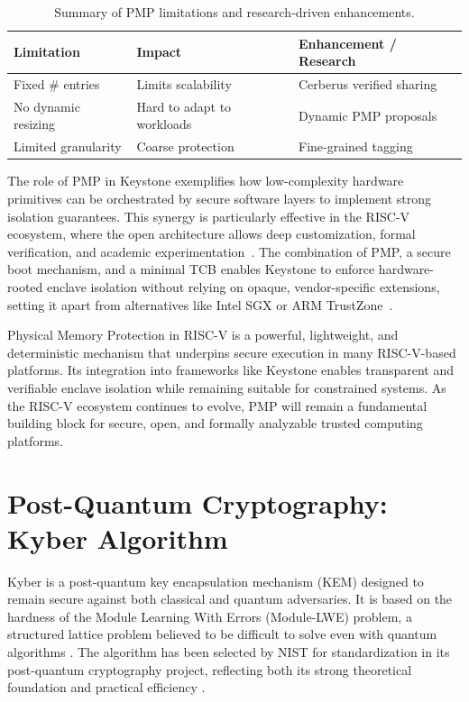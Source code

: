 \begin{table}[htbp]
\centering
\caption{Summary of PMP limitations and research‑driven enhancements.}
\label{tab:pmp-limitations}
\renewcommand{\arraystretch}{1.2}
\begin{tabular}{>{\raggedright}p{3cm} >{\raggedright}p{4cm} >{\raggedright\arraybackslash}p{5cm}}
\hline
\textbf{Limitation} & \textbf{Impact} & \textbf{Enhancement / Research} \\
\hline
Fixed \# entries & Limits scalability & Cerberus verified sharing \\
No dynamic resizing & Hard to adapt to workloads & Dynamic PMP proposals \\
Limited granularity & Coarse protection & Fine‑grained tagging \\
\hline
\end{tabular}
\end{table}

The role of PMP in Keystone exemplifies how low-complexity hardware primitives can be orchestrated by secure software layers to implement strong isolation guarantees. This synergy is particularly effective in the RISC-V ecosystem, where the open architecture allows deep customization, formal verification, and academic experimentation~\cite{Survey2023}. The combination of PMP, a secure boot mechanism, and a minimal TCB enables Keystone to enforce hardware-rooted enclave isolation without relying on opaque, vendor-specific extensions, setting it apart from alternatives like Intel SGX or ARM TrustZone~\cite{Lee2019,suzaki2021tsperf}.

Physical Memory Protection in RISC-V is a powerful, lightweight, and deterministic mechanism that underpins secure execution in many RISC-V-based platforms. Its integration into frameworks like Keystone enables transparent and verifiable enclave isolation while remaining suitable for constrained systems. As the RISC-V ecosystem continues to evolve, PMP will remain a fundamental building block for secure, open, and formally analyzable trusted computing platforms.

\section{Post-Quantum Cryptography: Kyber Algorithm}
\label{sec:kyber}

Kyber is a post-quantum key encapsulation mechanism (KEM) designed to remain secure against both classical and quantum adversaries. It is based on the hardness of the Module Learning With Errors (Module-LWE) problem, a structured lattice problem believed to be difficult to solve even with quantum algorithms \cite{kyber2021}. The algorithm has been selected by NIST for standardization in its post-quantum cryptography project, reflecting both its strong theoretical foundation and practical efficiency \cite{kyber2024}.

